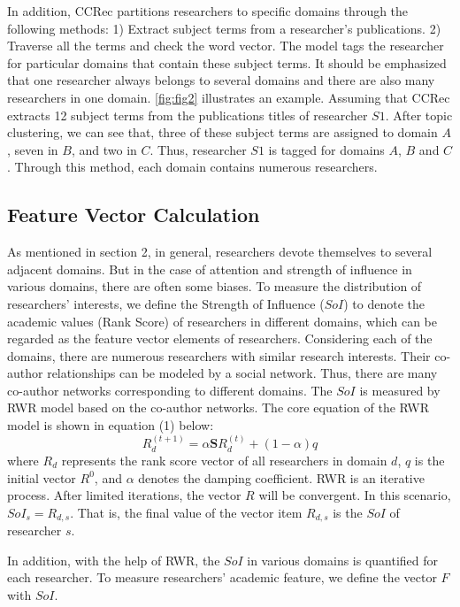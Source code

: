 In addition, CCRec partitions researchers to specific domains through the following methods: 1) Extract subject terms from a researcher's publications. 2) Traverse all the terms and check the word vector. The model tags the researcher for particular domains that contain these subject terms. It should be emphasized that one researcher always belongs to several domains and there are also many researchers in one domain. \autoref{fig:fig2} illustrates an example. Assuming that CCRec extracts 12 subject terms from the publications titles of researcher $S1$. After topic clustering, we can see that, three of these subject terms are assigned to domain $A$, seven in $B$, and two in $C$. Thus, researcher $S1$ is tagged for domains $A$, $B$ and $C$. Through this method, each domain contains numerous researchers.

\subsection*{Feature Vector Calculation}
As mentioned in section 2, in general, researchers devote themselves to several adjacent domains. But in the case of attention and strength of influence in various domains, there are often some biases. To measure the distribution of researchers' interests, we define the Strength of Influence ($SoI$) to denote the academic values (Rank Score) of researchers in different domains, which can be regarded as the feature vector elements of researchers. Considering each of the domains, there are numerous researchers with similar research interests. Their co-author relationships can be modeled by a social network. Thus, there are many co-author networks corresponding to different domains. The $SoI$ is measured by RWR model based on the co-author networks. The core equation of the RWR model is shown in equation (1) below:
\begin{equation}
R_{d}^{(t+1)}=\alpha \mathbf{S}R_{d}^{(t)}+(1-\alpha)q
\end{equation}
where $R_{d}$ represents the rank score vector of all researchers in domain $d$, $q$ is the initial vector $R^0$, and $\alpha$ denotes the damping coefficient. RWR is an iterative process. After limited iterations, the vector $R$ will be convergent. In this scenario, $SoI_{s}=R_{d,s}$. That is, the final value of the vector item $R_{d,s}$ is the $SoI$ of researcher $s$.

In addition, with the help of RWR, the $SoI$ in various domains is quantified for each researcher. To measure researchers' academic feature, we define the vector $F$ with $SoI$.


